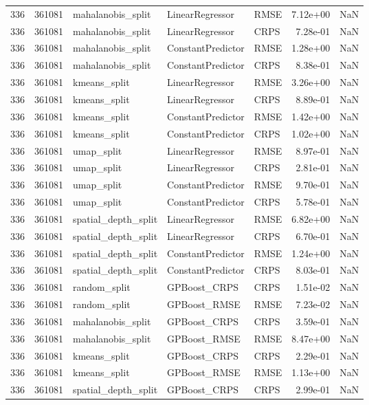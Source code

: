 \begin{tabular}{rrlllrr}
336 & 361081 & mahalanobis\_split & LinearRegressor & RMSE & 7.12e+00 & NaN \\
336 & 361081 & mahalanobis\_split & LinearRegressor & CRPS & 7.28e-01 & NaN \\
336 & 361081 & mahalanobis\_split & ConstantPredictor & RMSE & 1.28e+00 & NaN \\
336 & 361081 & mahalanobis\_split & ConstantPredictor & CRPS & 8.38e-01 & NaN \\
336 & 361081 & kmeans\_split & LinearRegressor & RMSE & 3.26e+00 & NaN \\
336 & 361081 & kmeans\_split & LinearRegressor & CRPS & 8.89e-01 & NaN \\
336 & 361081 & kmeans\_split & ConstantPredictor & RMSE & 1.42e+00 & NaN \\
336 & 361081 & kmeans\_split & ConstantPredictor & CRPS & 1.02e+00 & NaN \\
336 & 361081 & umap\_split & LinearRegressor & RMSE & 8.97e-01 & NaN \\
336 & 361081 & umap\_split & LinearRegressor & CRPS & 2.81e-01 & NaN \\
336 & 361081 & umap\_split & ConstantPredictor & RMSE & 9.70e-01 & NaN \\
336 & 361081 & umap\_split & ConstantPredictor & CRPS & 5.78e-01 & NaN \\
336 & 361081 & spatial\_depth\_split & LinearRegressor & RMSE & 6.82e+00 & NaN \\
336 & 361081 & spatial\_depth\_split & LinearRegressor & CRPS & 6.70e-01 & NaN \\
336 & 361081 & spatial\_depth\_split & ConstantPredictor & RMSE & 1.24e+00 & NaN \\
336 & 361081 & spatial\_depth\_split & ConstantPredictor & CRPS & 8.03e-01 & NaN \\
336 & 361081 & random\_split & GPBoost\_CRPS & CRPS & 1.51e-02 & NaN \\
336 & 361081 & random\_split & GPBoost\_RMSE & RMSE & 7.23e-02 & NaN \\
336 & 361081 & mahalanobis\_split & GPBoost\_CRPS & CRPS & 3.59e-01 & NaN \\
336 & 361081 & mahalanobis\_split & GPBoost\_RMSE & RMSE & 8.47e+00 & NaN \\
336 & 361081 & kmeans\_split & GPBoost\_CRPS & CRPS & 2.29e-01 & NaN \\
336 & 361081 & kmeans\_split & GPBoost\_RMSE & RMSE & 1.13e+00 & NaN \\
336 & 361081 & spatial\_depth\_split & GPBoost\_CRPS & CRPS & 2.99e-01 & NaN \\

\end{tabular}
